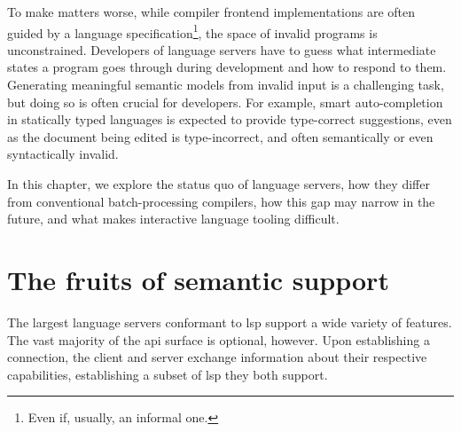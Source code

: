 To make matters worse, while compiler frontend implementations are often guided
by a language specification\footnote{Even if, usually, an informal one.}, the
space of invalid programs is unconstrained. Developers of language servers have
to guess what intermediate states a program goes through during development and
how to respond to them. Generating meaningful semantic models from invalid input
is a challenging task, but doing so is often crucial for developers. For
example, smart auto-completion in statically typed languages is expected to
provide type-correct suggestions, even as the document being edited is
type-incorrect, and often semantically or even syntactically invalid.

In this chapter, we explore the status quo of language servers, how they differ
from conventional batch-processing compilers, how this gap may narrow in the
future, and what makes interactive language tooling difficult.

\section{The fruits of semantic support}


The largest language servers conformant to \acrshort{lsp} support a wide variety
of features. The vast majority of the \acrshort{api} surface is optional,
however. Upon establishing a connection, the client and server exchange
information about their respective capabilities, establishing a subset of
\acrshort{lsp} they both support.



